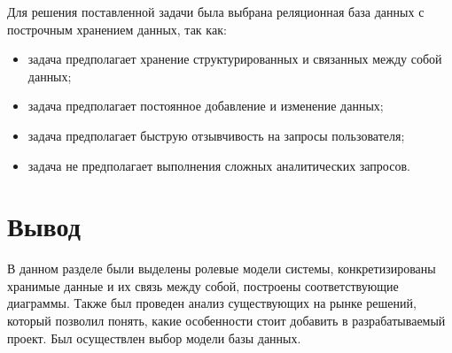 Для решения поставленной задачи была выбрана реляционная база данных с построчным хранением данных, так как:

\begin{itemize}
	\item задача предполагает хранение структурированных и связанных между собой данных;
	\item задача предполагает постоянное добавление и изменение данных;
	\item задача предполагает быструю отзывчивость на запросы пользователя;
	\item задача не предполагает выполнения сложных аналитических запросов.
\end{itemize}

\section*{Вывод}

В данном разделе были выделены ролевые модели системы, конкретизированы хранимые данные и их связь между собой, построены соответствующие диаграммы. Также был проведен анализ существующих на рынке решений, который позволил понять, какие особенности стоит добавить в разрабатываемый проект. Был осуществлен выбор модели базы данных.